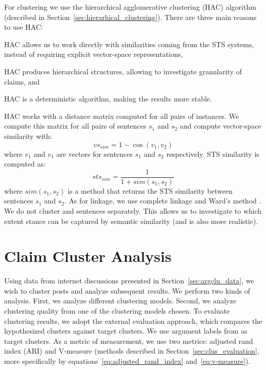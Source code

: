 For clustering we use the hierarchical agglomerative clustering (HAC) algorithm
(described in Section~\ref{sec:hierarhical_clustering}). 
There are three main reasons to use HAC: 
\begin{enumerate*}
\item HAC allows us to work directly with similarities
coming from the STS systems, instead of requiring explicit vector-space representations, 
\item HAC produces hierarchical structures, allowing to investigate
granularity of claims, and
\item HAC is a deterministic algorithm, making the results more stable.
\end{enumerate*}
HAC works with a distance matrix computed for all pairs of instances. 
We compute this matrix for all pairs of sentences $s_1$ and $s_2$ and 
compute vector-space similarity with: 
$$
\mathit{vs_{sim}} = 1 - \cos(v_1, v_2)
$$ 
where $v_1$ and $v_1$ are vectors for sentences $s_1$ and $s_2$ respectively.
STS similarity is computed as:
$$
\mathit{sts_{sim}} = \frac{1}{1 + \mathit{sim}(s_1, s_2)}
$$
where $\mathit{sim}(s_1, s_2)$ is a method that returns the STS similarity
between sentences $s_1$ and $s_2$. 
As for linkage, we use complete linkage and Ward's method \citep{ward1963hierarchical}. 
We do not cluster  and  sentences separately. 
This allows us to investigate to which extent stance can be captured by 
semantic similarity (and is also more realistic). 

\section{Claim Cluster Analysis}
\label{sec:argclu_analysis}

Using data from internet discussions presented in Section~\ref{sec:argclu_data}, 
we wish to cluster posts and analyze subsequent results. 
We perform two kinds of analysis. First, we analyze different clustering models. 
Second, we analyze clustering quality from one of the clustering models chosen. 
To evaluate clustering results, we adopt the external evaluation approach, which compares the 
hypothesized clusters against target clusters. 
We use argument labels from \citet{hasan2014you} as target clusters. 
As a metric of measurement, we use two metrics: 
adjusted rand index (ARI) 
\citep{steinley2004properties} and V-measure \citep{rosenberg2007v}
(methods described in Section~\ref{sec:clus_evaluation}, more specifically by 
equations~\ref{eq:adjusted_rand_index} and~\ref{eq:v-measure}). 

